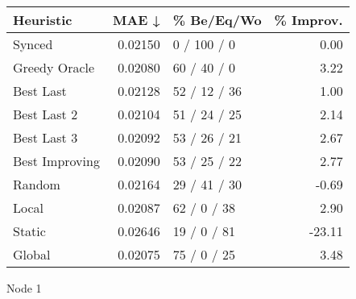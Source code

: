 \begin{tabular}{lrlr}
\toprule
\textbf{Heuristic} & \textbf{MAE ↓} & \textbf{\% Be/Eq/Wo} & \textbf{\% Improv.} \\
\midrule
            Synced &        0.02150 &          0 / 100 / 0 &                0.00 \\
     Greedy Oracle &        0.02080 &          60 / 40 / 0 &                3.22 \\
         Best Last &        0.02128 &         52 / 12 / 36 &                1.00 \\
       Best Last 2 &        0.02104 &         51 / 24 / 25 &                2.14 \\
       Best Last 3 &        0.02092 &         53 / 26 / 21 &                2.67 \\
    Best Improving &        0.02090 &         53 / 25 / 22 &                2.77 \\
            Random &        0.02164 &         29 / 41 / 30 &               -0.69 \\
             Local &        0.02087 &          62 / 0 / 38 &                2.90 \\
            Static &        0.02646 &          19 / 0 / 81 &              -23.11 \\
            Global &        0.02075 &          75 / 0 / 25 &                3.48 \\
\bottomrule
\end{tabular}
\caption{Node 1}
\label{tab:iid_lr01_le2_bs4_1}
